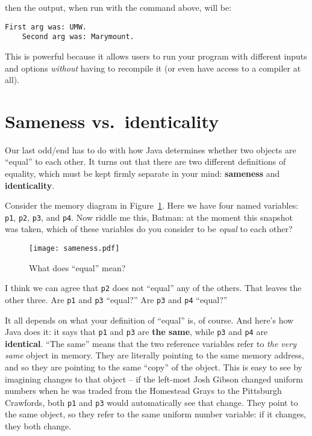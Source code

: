 then the output, when run with the command above, will be:

\begin{Verbatim}[fontsize=\small,samepage=true,frame=none]
    First arg was: UMW.
    Second arg was: Marymount.
\end{Verbatim}

This is powerful because it allows users to run your program with different
inputs and options \textit{without} having to recompile it (or even have
access to a compiler at all).

\section{Sameness vs.~identicality}

Our last odd/end has to do with how Java determines whether two objects are
``equal'' to each other. It turns out that there are two different definitions
of equality, which must be kept firmly separate in your mind:
\textbf{sameness} and \textbf{identicality}.

Consider the memory diagram in Figure~\ref{fig:sameness}. Here we have four
named variables: \texttt{p1}, \texttt{p2}, \texttt{p3}, and \texttt{p4}. Now
riddle me this, Batman: at the moment this snapshot was taken, which of these
variables do you consider to be \textit{equal} to each other?

\begin{figure}[ht]
\centering
\texttt{[image: sameness.pdf]}
\caption{What does ``equal'' mean?}
\label{fig:sameness}
\end{figure}

I think we can agree that \texttt{p2} does not ``equal'' any of the others.
That leaves the other three. Are \texttt{p1} and \texttt{p3} ``equal?'' Are
\texttt{p3} and \texttt{p4} ``equal?''

It all depends on what your definition of ``equal'' is, of course. And here's
how Java does it: it says that \texttt{p1} and \texttt{p3} are \textbf{the
same}, while \texttt{p3} and \texttt{p4} are \textbf{identical}. ``The same''
means that the two reference variables refer to \textit{the very same} object
in memory. They are literally pointing to the same memory address, and so they
are pointing to the same ``copy'' of the object. This is easy to see by
imagining changes to that object -- if the left-most Josh Gibson changed
uniform numbers when he was traded from the Homestead Grays to the Pittsburgh
Crawfords, both \texttt{p1} and \texttt{p3} would automatically see that
change. They point to the same object, so they refer to the same uniform
number variable: if it changes, they both change.

